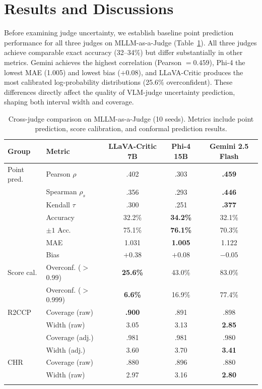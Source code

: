 \documentclass{article}
\begin{document}
\section{Results and Discussions}

Before examining judge uncertainty, we establish baseline point prediction performance for all three judges on MLLM-as-a-Judge (Table~\ref{tab:cross_judge}). All three judges achieve comparable exact accuracy (32--34\%) but differ substantially in other metrics. Gemini achieves the highest correlation (Pearson $= 0.459$), Phi-4 the lowest MAE (1.005) and lowest bias ($+0.08$), and LLaVA-Critic produces the most calibrated log-probability distributions (25.6\% overconfident). These differences directly affect the quality of VLM-judge uncertainty prediction, shaping both interval width and coverage.

\begin{table}[t]
\centering
\caption{Cross-judge comparison on MLLM-as-a-Judge (10 seeds). Metrics include point prediction, score calibration, and conformal prediction results.}
\label{tab:cross_judge}
\small
\begin{tabular}{llccc}
\toprule
\textbf{Group} & \textbf{Metric} & \textbf{LLaVA-Critic 7B} & \textbf{Phi-4 15B} & \textbf{Gemini 2.5 Flash} \\
\midrule

Point pred. & Pearson $\rho$ & .402 & .303 & \textbf{.459} \\
 & Spearman $\rho_s$ & .356 & .293 & \textbf{.446} \\
 & Kendall $\tau$ & .300 & .251 & \textbf{.377} \\
 & Accuracy & 32.2\% & \textbf{34.2\%} & 32.1\% \\
 & $\pm 1$ Acc. & 75.1\% & \textbf{76.1\%} & 70.3\% \\
 & MAE & 1.031 & \textbf{1.005} & 1.122 \\
 & Bias & $+0.38$ & $+0.08$ & $\mathbf{-0.05}$ \\
\midrule
Score cal. & Overconf. ($>$0.99) & \textbf{25.6\%} & 43.0\% & 83.0\% \\
 & Overconf. ($>$0.999) & \textbf{6.6\%} & 16.9\% & 77.4\% \\
\midrule
R2CCP & Coverage (raw) & \textbf{.900} & .891 & .898 \\
 & Width (raw) & 3.05 & 3.13 & \textbf{2.85} \\
 & Coverage (adj.) & .981 & .981 & .980 \\
 & Width (adj.) & 3.60 & 3.70 & \textbf{3.41} \\
\midrule
CHR & Coverage (raw) & .880 & .896 & .880 \\
 & Width (raw) & 2.97 & 3.16 & \textbf{2.80} \\

\bottomrule\vspace{-15pt}
\end{tabular}
\end{table}
\end{document}
